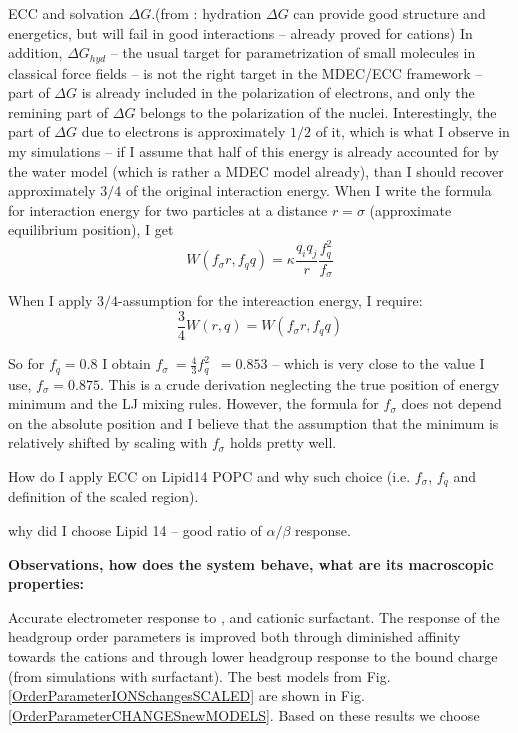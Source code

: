 \documentclass[aip,jcp]{revtex4}
\begin{document}
ECC and solvation $\Delta G$.(from \cite{Leontyev2015}: hydration $\Delta G$ can provide good structure and energetics, but will fail in good interactions -- already proved for cations)
In addition, $\Delta G_{hyd}$ -- the usual target for parametrization of small molecules in classical force fields -- is not the right target in the MDEC/ECC framework -- part of $\Delta G$ is already included in the polarization of electrons, and only the remining part of $\Delta G$ belongs to the polarization of the nuclei. 
Interestingly, the part of $\Delta G$ due to electrons is approximately $1/2$ of it, which is what I observe in my simulations -- if I assume that half of this energy is already accounted for by the water model (which is rather a MDEC model already), than I should recover approximately $3/4$ of the original interaction energy. 
When I write the formula for interaction energy for two particles at a distance $r=\sigma$ (approximate equilibrium position), I get
\begin{equation}
W(f_\sigma r,f_q q) = \kappa \frac{q_i q_j}{r} \frac{f_q^2}{f_\sigma}
\end{equation}

When I apply $3/4$-assumption for the intereaction energy, I require: 
\begin{equation}
\frac{3}{4} W(r,q) = W(f_\sigma r, f_q q)
\end{equation}

So for $f_q=0.8$ I obtain $f_\sigma ~= \frac{4}{3} f_q^2 \,\,\, = 0.853$ -- which is very close to the value I use, $f_\sigma=0.875$. This is a crude derivation neglecting the true position of energy minimum and the LJ mixing rules. However, the formula for $f_\sigma$ does not depend on the absolute position and I believe that the assumption that the minimum is relatively shifted by scaling with $f_\sigma$ holds pretty well. 


How do I apply ECC on Lipid14 POPC and why such choice (i.e. $f_\sigma$, $f_q$ and definition of the scaled region).

why did I choose Lipid 14 -- good ratio of $\alpha / \beta$ response.

\textbf{Observations, how does the system behave, what are its macroscopic properties:}

Accurate electrometer response to ,  and  cationic surfactant. 
The response of the headgroup order parameters is improved both through diminished affinity towards the cations and through lower headgroup response to the bound charge (from simulations with  surfactant). 
The best models from Fig.  \ref{OrderParameterIONSchangesSCALED} are shown in
Fig. \ref{OrderParameterCHANGESnewMODELS}. Based on these results we choose
\end{document}
